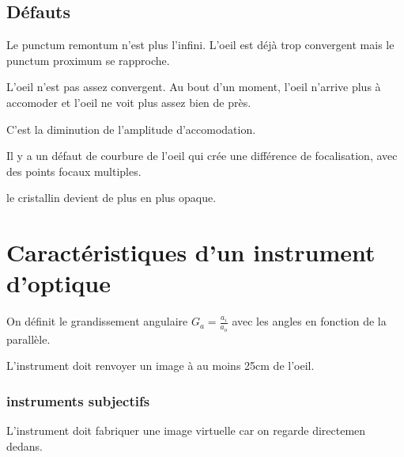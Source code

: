 \documentclass[french]{yLectureNote}
\begin{document}
\subsection{Défauts}
\begin{definition}[Myopie]
Le punctum remontum n'est plus l'infini. L'oeil est déjà trop convergent mais le punctum proximum se rapproche.
\end{definition}
\begin{definition}[Hypermetropie]
 L'oeil n'est pas assez convergent. Au bout d'un moment, l'oeil n'arrive plus à accomoder et l'oeil ne voit plus assez bien de près.
\end{definition}
\begin{definition}[Presbycie]
C'est la diminution de l'amplitude d'accomodation.
\end{definition}
\begin{definition}[Astigmatisme]
Il y  a un défaut de courbure de l'oeil qui crée une différence de focalisation, avec des points focaux multiples.
\end{definition}
\begin{definition}[Cataractacte]
le cristallin devient de plus en plus opaque.
\end{definition}
%
%
\section{Caractéristiques d'un instrument d'optique}
\begin{definition}
On définit le grandissement angulaire \(G_a = \frac{a_i}{a_o}\) avec les angles en fonction de la parallèle.
\end{definition}
L'instrument doit renvoyer un image à au moins 25cm de l'oeil.
\subsubsection{instruments subjectifs}
L'instrument doit fabriquer une image virtuelle car on regarde directemen dedans.
\end{document}
